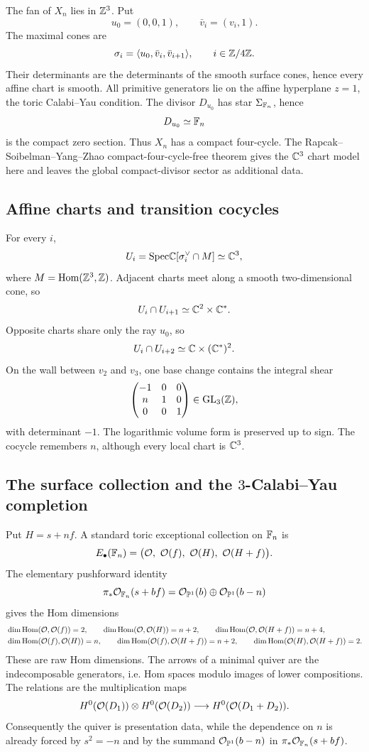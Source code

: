 The fan of \(X_n\) lies in \(\mathbb{Z}^3\). Put
\[
 u_0=(0,0,1),\qquad \bar v_i=(v_i,1).
\]
The maximal cones are
\[
 \sigma_i=\langle u_0,\bar v_i,\bar v_{i+1}\rangle,\qquad i\in\mathbb{Z}/4\mathbb{Z} .
\]
Their determinants are the determinants of the smooth surface cones,
hence every affine chart is smooth. All primitive generators lie on
the affine hyperplane \(z=1\), the toric Calabi--Yau condition. The
divisor \(D_{u_0}\) has star \(\Sigma_{\mathbb{F}_n}\), hence
\[
 D_{u_0}\simeq\mathbb{F}_n
\]
is the compact zero section. Thus \(X_n\) has a compact four-cycle.
The Rapcak--Soibelman--Yang--Zhao compact-four-cycle-free theorem gives
the \(\mathbb{C}^3\) chart model here and leaves the global compact-divisor
sector as additional data.

\subsection*{Affine charts and transition cocycles}

For every \(i\),
\[
 U_i=\mathrm{Spec}\mathbb{C}[\sigma_i^\vee\cap M]\simeq\mathbb{C}^3,
\]
where \(M=\mathrm{Hom}(\mathbb{Z}^3,\mathbb{Z})\). Adjacent charts meet along a smooth
two-dimensional cone, so
\[
 U_i\cap U_{i+1}\simeq\mathbb{C}^2\times\mathbb{C}^*.
\]
Opposite charts share only the ray \(u_0\), so
\[
 U_i\cap U_{i+2}\simeq\mathbb{C}\times(\mathbb{C}^*)^2.
\]
On the wall between \(v_2\) and \(v_3\), one base change contains the
integral shear
\[
 \begin{pmatrix} -1 & 0 & 0 \\ n & 1 & 0 \\ 0 & 0 & 1 \end{pmatrix}
 \in\mathrm{GL}_3(\mathbb{Z}),
\]
with determinant \(-1\). The logarithmic volume form is preserved up
to sign. The cocycle remembers \(n\), although every local chart is
\(\mathbb{C}^3\).

\subsection*{The surface collection and the \(3\)-Calabi--Yau completion}

Put \(H=s+nf\). A standard toric exceptional collection on \(\mathbb{F}_n\) is
\[
 E_\bullet(\mathbb{F}_n)=
 \bigl(\mathcal{O},\ \mathcal{O}(f),\ \mathcal{O}(H),\ \mathcal{O}(H+f)\bigr).
\]
The elementary pushforward identity
\[
 \pi_*\mathcal{O}_{\mathbb{F}_n}(s+bf)
 =\mathcal{O}_{\mathbb{P}^1}(b)\oplus\mathcal{O}_{\mathbb{P}^1}(b-n)
\]
gives the Hom dimensions
\begin{align*}
 &\dim\mathrm{Hom}(\mathcal{O},\mathcal{O}(f))=2,\qquad
 \dim\mathrm{Hom}(\mathcal{O},\mathcal{O}(H))=n+2,\qquad
 \dim\mathrm{Hom}(\mathcal{O},\mathcal{O}(H+f))=n+4,\\
 &\dim\mathrm{Hom}(\mathcal{O}(f),\mathcal{O}(H))=n,\qquad
 \dim\mathrm{Hom}(\mathcal{O}(f),\mathcal{O}(H+f))=n+2,\qquad
 \dim\mathrm{Hom}(\mathcal{O}(H),\mathcal{O}(H+f))=2 .
\end{align*}
These are raw Hom dimensions. The arrows of a minimal quiver are the
indecomposable generators, i.e. Hom spaces modulo images of lower
compositions. The relations are the multiplication maps
\[
 H^0(\mathcal{O}(D_1))\otimes H^0(\mathcal{O}(D_2))
 \longrightarrow H^0(\mathcal{O}(D_1+D_2)).
\]
Consequently the quiver is presentation data, while the dependence on
\(n\) is already forced by \(s^2=-n\) and by the summand
\(\mathcal{O}_{\mathbb{P}^1}(b-n)\) in \(\pi_*\mathcal{O}_{\mathbb{F}_n}(s+bf)\).

